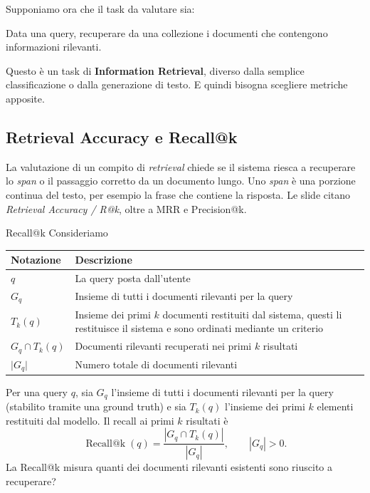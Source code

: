 Supponiamo ora che il task da valutare sia:
\begin{center}
    Data una query, recuperare da una collezione i documenti che contengono informazioni rilevanti.
\end{center}
Questo è un task di \textbf{Information Retrieval}, diverso dalla semplice classificazione o dalla generazione di testo.
E quindi bisogna scegliere metriche apposite.


\subsection{Retrieval Accuracy e Recall@k}

La valutazione di un compito di \emph{retrieval} chiede se il sistema riesca a recuperare lo \emph{span} o il passaggio corretto da un documento lungo. Uno \emph{span} è una porzione continua del testo, per esempio la frase che contiene la risposta. Le slide citano \emph{Retrieval Accuracy / R@k}, oltre a MRR e Precision@k.

\begin{definition}{Recall@k}
Consideriamo \\
\begin{tabular}{|p{}|p{}|}
\hline
\textbf{Notazione} & \textbf{Descrizione} \\ \hline
$q$ & La query posta dall'utente \\ \hline
$G_q$ & Insieme di tutti i documenti rilevanti per la query \\ \hline
$T_k(q)$ & Insieme dei primi $k$ documenti restituiti dal sistema, questi li restituisce il sistema e sono ordinati mediante un criterio \\ \hline
$G_q \cap T_k(q)$ & Documenti rilevanti recuperati nei primi $k$ risultati \\ \hline
$\vert{}G_q\vert{}$ & Numero totale di documenti rilevanti \\ \hline
\end{tabular}
Per una query $q$, sia $G_q$ l'insieme di tutti i documenti rilevanti per la query (stabilito tramite una ground truth) e sia $T_k(q)$ l'insieme dei primi $k$ elementi restituiti dal modello. Il recall ai primi $k$ risultati è
\begin{equation}
\operatorname{Recall@k}(q)=\frac{|G_q\cap T_k(q)|}{|G_q|},\qquad |G_q|>0.
\end{equation}
La Recall@k misura quanti dei documenti rilevanti esistenti sono riuscito a recuperare?
\end{definition}


